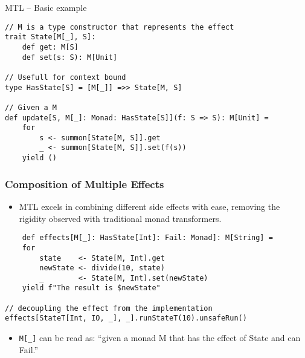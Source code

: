 \documentclass[presentation, 10pt]{beamer}\mode<presentation>{\usetheme{AMSBolognaFC}}
\begin{document}
\begin{frame}[fragile]{MTL -- Basic example}
\begin{tcolorbox}
\begin{verbatim}
// M is a type constructor that represents the effect
trait State[M[_], S]:
	def get: M[S]
	def set(s: S): M[Unit]

// Usefull for context bound
type HasState[S] = [M[_]] =>> State[M, S]

// Given a M 
def update[S, M[_]: Monad: HasState[S]](f: S => S): M[Unit] =
	for
		s <- summon[State[M, S]].get
		_ <- summon[State[M, S]].set(f(s))
	yield ()
\end{verbatim}
\end{tcolorbox}
\end{frame}
\begin{frame}[fragile]
	\frametitle{Composition of Multiple Effects}
	
	\begin{itemize}
		\item MTL excels in combining different side effects with ease, removing the rigidity observed with traditional monad transformers.
	\end{itemize}
\begin{tcolorbox}
	
\begin{verbatim}
	def effects[M[_]: HasState[Int]: Fail: Monad]: M[String] =
	for
		state    <- State[M, Int].get
		newState <- divide(10, state)
		_        <- State[M, Int].set(newState)
	yield f"The result is $newState"

// decoupling the effect from the implementation
effects[StateT[Int, IO, _], _].runStateT(10).unsafeRun()
\end{verbatim}
\end{tcolorbox}

\begin{itemize}
	\item \texttt{M[_]} can be read as: ``given a monad M that has the effect of State and can Fail.''
\end{itemize}	
\end{frame}
\end{document}
